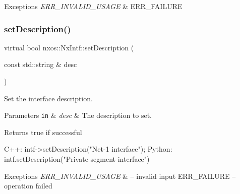 \begin{DoxyExceptions}{Exceptions}
{\em E\+R\+R\+\_\+\+I\+N\+V\+A\+L\+I\+D\+\_\+\+U\+S\+A\+GE} & E\+R\+R\+\_\+\+F\+A\+I\+L\+U\+RE \\
\hline
\end{DoxyExceptions}
\mbox{\label{classnxos_1_1_nx_intf_aaaa5e4a9b9161b2908eb9c7979e96f8e}} 
\subsubsection{\texorpdfstring{set\+Description()}{setDescription()}}
{\footnotesize\ttfamily virtual bool nxos\+::\+Nx\+Intf\+::set\+Description (\begin{DoxyParamCaption}\item[{const std\+::string \&}]{desc }\end{DoxyParamCaption})\hspace{0.3cm}{\ttfamily [pure virtual]}}

Set the interface description. 
\begin{DoxyParams}[1]{Parameters}
\mbox{\tt in}  & {\em desc} & The description to set. \\
\hline
\end{DoxyParams}
\begin{DoxyReturn}{Returns}
true if successful
\end{DoxyReturn}

\begin{DoxyCode}
C++:
   intf->setDescription(\textcolor{stringliteral}{"Net-1 interface"});
Python:
   intf.setDescription(\textcolor{stringliteral}{"Private segment interface"})
\end{DoxyCode}



\begin{DoxyExceptions}{Exceptions}
{\em E\+R\+R\+\_\+\+I\+N\+V\+A\+L\+I\+D\+\_\+\+U\+S\+A\+GE} & -- invalid input E\+R\+R\+\_\+\+F\+A\+I\+L\+U\+RE -- operation failed \\
\hline
\end{DoxyExceptions}
\mbox{\label{classnxos_1_1_nx_intf_a90a3cca36e76717085fecf575e815139}} 
